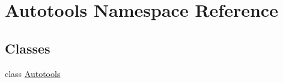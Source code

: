 \hypertarget{namespace_autotools}{\section{Autotools Namespace Reference}
\label{namespace_autotools}
}
\subsection*{Classes}
\begin{DoxyCompactItemize}
\item 
class \hyperlink{class_autotools_1_1_autotools}{Autotools}
\end{DoxyCompactItemize}
